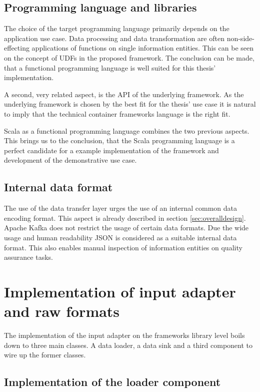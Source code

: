 \subsection{Programming language and libraries}
The choice of the target programming language primarily depends on the application use case. Data processing and data transformation are often non-side-effecting applications of functions on single information entities. This can be seen on the concept of UDFs in the proposed framework. The conclusion can be made, that a functional programming language is well suited for this thesis' implementation. 

A second, very related aspect, is the API of the underlying framework. As the underlying framework is chosen by the best fit for the thesis' use case it is natural to imply that the technical container frameworks language is the right fit. 

Scala as a functional programming language combines the two previous aspects. This brings us to the conclusion, that the Scala programming language is a perfect candidate for a example implementation of the framework and development of the demonstrative use case.

\subsection{Internal data format}
The use of the data transfer layer urges the use of an internal common data encoding format. This aspect is already described in section \ref{sec:overalldesign}. Apache Kafka does not restrict the usage of certain data formats. Due the wide usage and human readability JSON is considered as a suitable internal data format. This also enables manual inspection of information entities on quality assurance tasks. 

\section{Implementation of input adapter and raw formats}

The implementation of the input adapter on the frameworks library level boils down to three main classes. A data loader, a data sink and a third component to wire up the former classes. 

\subsection{Implementation of the loader component \label{ssec:loadercomponent}}

